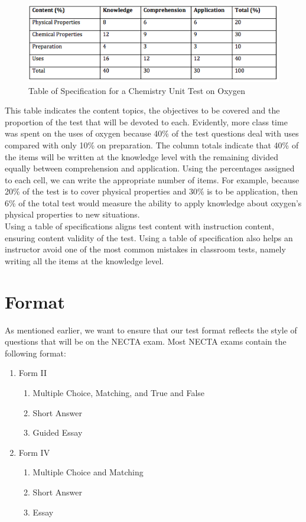 \begin{figure}[h!]
\begin{center}
\includegraphics[scale=1]{./img/picture-9.png}
\caption{Table of Specification for a Chemistry Unit Test on Oxygen}
\end{center}
\end{figure}

This table indicates the content topics, the objectives to be covered and the proportion of the test that will be devoted to each. Evidently, more class time was spent on the uses of oxygen because 40\% of the test questions deal with uses compared with only 10\% on preparation. The column totals indicate that 40\% of the items will be written at the knowledge level with the remaining divided equally between comprehension and application. Using the percentages assigned to each cell, we can write the appropriate number of items. For example, because 20\% of the test is to cover physical properties and 30\% is to be application, then 6\% of the total test would measure the ability to apply knowledge about oxygen's physical properties to new situations.\\

Using a table of specifications aligns test content with instruction content, ensuring content validity of the test.  Using a table of specification also helps an instructor avoid one of the most common mistakes in classroom tests, namely writing all the items at the knowledge level.

\section{Format}

As mentioned earlier, we want to ensure that our test format reflects the style of questions that will be on the NECTA exam.  Most NECTA exams contain the following format:

\begin{enumerate}
 \item Form II
 \begin{enumerate}
  \item Multiple Choice, Matching, and True and False
  \item Short Answer
  \item Guided Essay
 \end{enumerate}
 \item Form IV
  \begin{enumerate}
  \item Multiple Choice and Matching
  \item Short Answer
  \item Essay
 \end{enumerate}
\end{enumerate}

